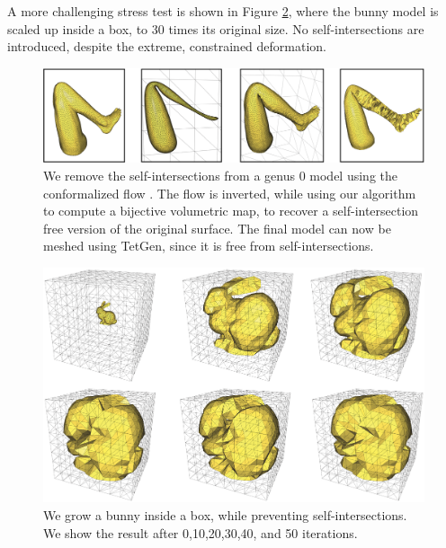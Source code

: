 A more challenging stress test is shown in Figure \ref{scaf:fig:rabbit}, where the bunny model is scaled up inside a box, to 30 times its original size. No self-intersections are introduced, despite the extreme, constrained deformation.

\begin{figure}[t]
\includegraphics[width=\columnwidth]{scaf-tex/figs/leg-flow}
\caption{We remove the self-intersections from a genus 0 model using the conformalized flow \protect\cite{Kazhdan:2012,Sacht:2013}. The flow is inverted, while using our algorithm to compute a bijective volumetric map, to recover a self-intersection free version of the original surface. The final model can now be meshed using TetGen, since it is free from self-intersections.}
\vspace{-0.2cm}
\label{scaf:fig:flow}
\end{figure}

\begin{figure}[t]
\includegraphics[width=0.8\columnwidth]{scaf-tex/figs/rabbit_grow}
\caption{We grow a bunny inside a box, while preventing  self-intersections. We show the result after 0,10,20,30,40, and 50 iterations.}
\label{scaf:fig:rabbit}
\end{figure}


